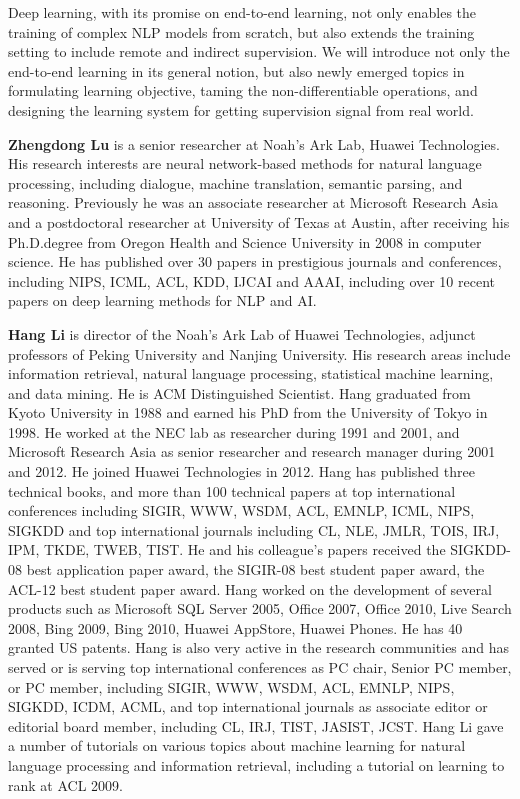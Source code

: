 \begin{tutorial}
Deep learning, with its promise on end-to-end learning, not only enables the training of complex NLP models from scratch, but also extends the training setting to include remote and indirect supervision. We will introduce not only the end-to-end learning in its general notion, but also newly emerged topics in formulating learning objective, taming the non-differentiable operations, and designing the learning system for getting supervision signal from real world.

\end{tutorial}

\begin{bio}

{\bfseries Zhengdong Lu} is a senior researcher at Noah's Ark Lab, Huawei Technologies. His research interests are neural network-based methods for natural language processing, including dialogue, machine translation, semantic parsing, and reasoning. Previously he was an associate researcher at Microsoft Research Asia and a postdoctoral researcher at University of Texas at Austin, after receiving his Ph.D.degree from Oregon Health and Science University in 2008 in computer science. He has published over 30 papers in prestigious journals and conferences, including NIPS, ICML, ACL, KDD, IJCAI and AAAI, including over 10 recent papers on deep learning methods for NLP and AI.

{\bfseries Hang Li} is director of the Noah's Ark Lab of Huawei Technologies, adjunct professors of Peking University and Nanjing University. His research areas include information retrieval, natural language processing, statistical machine learning, and data mining. He is ACM Distinguished Scientist. Hang graduated from Kyoto University in 1988 and earned his PhD from the University of Tokyo in 1998. He worked at the NEC lab as researcher during 1991 and 2001, and Microsoft Research Asia as senior researcher and research manager during 2001 and 2012. He joined Huawei Technologies in 2012. Hang has published three technical books, and more than 100 technical papers at top international conferences including SIGIR, WWW, WSDM, ACL, EMNLP, ICML, NIPS, SIGKDD and top international journals including CL, NLE, JMLR, TOIS, IRJ, IPM, TKDE, TWEB, TIST. He and his colleague's papers received the SIGKDD-08 best application paper award, the SIGIR-08 best student paper award, the ACL-12 best student paper award. Hang worked on the development of several products such as Microsoft SQL Server 2005, Office 2007, Office 2010, Live Search 2008, Bing 2009, Bing 2010, Huawei AppStore, Huawei Phones. He has 40 granted US patents. Hang is also very active in the research communities and has served or is serving top international conferences as PC chair, Senior PC member, or PC member, including SIGIR, WWW, WSDM, ACL, EMNLP, NIPS, SIGKDD, ICDM, ACML, and top international journals as associate editor or editorial board member, including CL, IRJ, TIST, JASIST, JCST. Hang Li gave a number of tutorials on various topics about machine learning for natural language processing and information retrieval, including a tutorial on learning to rank at ACL 2009.

\end{bio}



